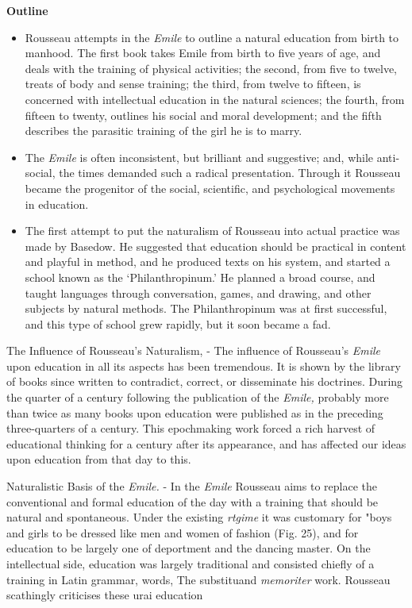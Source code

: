 \documentclass[
]{book}
\providecommand{\tightlist}{%
  \setlength{\itemsep}{0pt}\setlength{\parskip}{0pt}}
\begin{document}
\textbf{Outline}

\begin{itemize}
\tightlist
\item
  Rousseau attempts in the \emph{Emile} to outline a natural education from birth to manhood. The first book takes Emile from birth to five years of age, and deals with the training of physical activities; the second, from five to twelve, treats of body and sense training; the third, from twelve to fifteen, is concerned with intellectual education in the natural sciences; the fourth, from fifteen to twenty, outlines his social and moral development; and the fifth describes the parasitic training of the girl he is to marry.
\item
  The \emph{Emile} is often inconsistent, but brilliant and suggestive; and, while anti-social, the times demanded such a radical presentation. Through it Rousseau became the progenitor of the social, scientific, and psychological movements in education.
\item
  The first attempt to put the naturalism of Rousseau into actual practice was made by Basedow. He suggested that education should be practical in content and playful in method, and he produced texts on his system, and started a school known as the `Philanthropinum.' He planned a broad course, and taught languages through conversation, games, and drawing, and other subjects by natural methods. The Philanthropinum was at first successful, and this type of school grew rapidly, but it soon became a fad.
\end{itemize}

The Influence of Rousseau's Naturalism, - The influence of Rousseau's \emph{Emile} upon education in all its aspects has been tremendous. It is shown by the library of books since written to contradict, correct, or disseminate his doctrines. During the quarter of a century following the publication of the \emph{Emile,} probably more than twice as many books upon education were published as in the preceding three-quarters of a century. This epochmaking work forced a rich harvest of educational thinking for a century after its appearance, and has affected our ideas upon education from that day to this.

Naturalistic Basis of the \emph{Emile.} - In the \emph{Emile} Rousseau aims to replace the conventional and formal education of the day with a training that should be natural and spontaneous. Under the existing \emph{rtgime} it was customary for "boys and girls to be dressed like men and women of fashion (Fig. 25), and for education to be largely one of deportment and the dancing master. On the intellectual side, education was largely traditional and consisted chiefly of a training in Latin grammar, words, The substituand \emph{memoriter} work. Rousseau scathingly criticises these urai education
\end{document}
